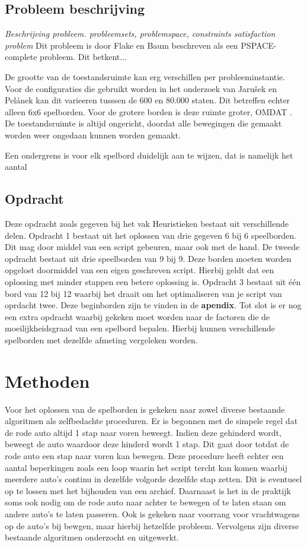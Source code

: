 \documentclass[a4paper]{article}
\begin{document}
\subsection{Probleem beschrijving}
\textit{Beschrijving probleem. probleemsets, problemspace, constraints satisfaction problem}
Dit probleem is door Flake en Baum \cite{flake2002rush} beschreven als een PSPACE-complete probleem. Dit betkent...

De grootte van de toestandsruimte kan erg verschillen per probleeminstantie. Voor de configuraties die gebruikt worden in het onderzoek van Jarušek en Pelánek \cite{jaruvsek2011determines} kan dit varieeren tusssen de 600 en 80.000 staten. Dit betreffen echter alleen 6x6 spelborden. Voor de grotere borden is deze ruimte groter, OMDAT . De toestandsruimte is altijd ongericht, doordat alle bewegingen die gemaakt worden weer ongedaan kunnen worden gemaakt.

Een ondergrens is voor elk spelbord duidelijk aan te wijzen, dat is namelijk het aantal 

\subsection{Opdracht}
Deze opdracht zoals gegeven bij het vak Heuristieken bestaat uit verschillende delen. Opdracht 1 bestaat uit het oplossen van drie gegeven 6 bij 6 speelborden. Dit mag door middel van een script gebeuren, maar ook met de hand. De tweede opdracht bestaat uit drie speelborden van 9 bij 9. Deze borden moeten worden opgelost doormiddel van een eigen geschreven script. Hierbij geldt dat een oplossing met minder stappen een betere oplossing is. Opdracht 3 bestaat uit één bord van 12 bij 12 waarbij het draait om het optimaliseren van je script van oprdacht twee. Deze beginborden zijn te vinden in de \textbf{apendix}. Tot slot is er nog een extra opdracht waarbij gekeken moet worden naar de factoren die de moeilijkheidsgraad van een spelbord bepalen. Hierbij kunnen verschillende spelborden met dezelfde afmeting vergeleken worden.

\section{Methoden}
Voor het oplossen van de spelborden is gekeken naar zowel diverse bestaande algoritmen als zelfbedachte proceduren. Er is begonnen met de simpele regel dat de rode auto altijd 1 stap naar voren beweegt. Indien deze gehinderd wordt, beweegt de auto waardoor deze hinderd wordt 1 stap. Dit gaat door totdat de rode auto een stap naar voren kan bewegen. Deze procedure heeft echter een aantal beperkingen zoals een loop waarin het script tercht kan komen waarbij meerdere auto's continu in dezelfde volgorde dezelfde stap zetten. Dit is eventueel op te lossen met het bijhouden van een archief. Daarnaast is het in de praktijk soms ook nodig om de rode auto naar achter te bewegen of te laten staan om andere auto's te laten passeren. Ook is gekeken naar voorrang voor vrachtwagens op de auto's bij bewgen, maar hierbij hetzelfde probleem. Vervolgens zijn diverse bestaande algoritmen onderzocht en uitgewerkt.
\end{document}
